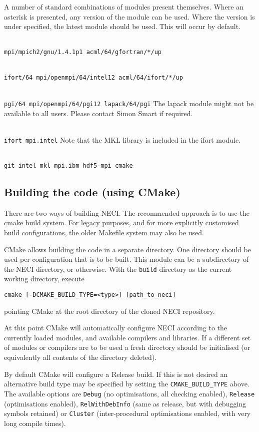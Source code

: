 \documentclass[a4paper,notitlepage]{scrreprt}
\newcommand\headitem[1]{\needspace{1.5\baselineskip}\item[{\boldmath #1 \nopagebreak}] \hfill \\ \nopagebreak}
\let\code\lstinline
\begin{document}
	A number of standard combinations of modules present themselves. Where an
	asterisk is presented, any version of the module can be used. Where the
	version is under specified, the latest module should be used. This will
	occur by default.
	\begin{description}
		\headitem{gfortran (Cambridge)}
			\code{mpi/mpich2/gnu/1.4.1p1 acml/64/gfortran/*/up}
		\headitem{ifort (Cambridge)}
			\code{ifort/64 mpi/openmpi/64/intel12 acml/64/ifort/*/up}
		\headitem{PGI (Cambridge)}
			\code{pgi/64 mpi/openmpi/64/pgi12 lapack/64/pgi} \linebreak
			The lapack module might not be available to all users. Please
			contact Simon Smart if required.
		\headitem{ifort (Max Planck FKF)}
			\code{ifort mpi.intel}\linebreak
			Note that the MKL library is included in the ifort module.
		\headitem{ifort (hydra)}
			\code{git intel mkl mpi.ibm hdf5-mpi cmake}
	\end{description}

\subsection{Building the code (using CMake)}
	There are two ways of building NECI. The recommended approach is to use
	the cmake build system. For legacy purposes, and for more explicitly
	customised build configurations, the older Makefile system may also
	be used.

	CMake allows building the code in a separate directory. One directory
	should be used per configuration that is to be built. This module can
	be a subdirectory of the NECI directory, or otherwise.
	With the \code{build} directory as the current working directory,
	execute
	\begin{lstlisting}[gobble=4]
	cmake [-DCMAKE_BUILD_TYPE=<type>] [path_to_neci]
	\end{lstlisting}
	pointing CMake at the root directory of the cloned NECI repository.

	At this point CMake will automatically configure NECI according to the
	currently loaded modules, and available compilers and libraries. If a
	different set of modules or compilers are to be used a fresh directory
	should be initialised (or equivalently all contents of the directory
	deleted).

	By default CMake will configure a Release build. If this is not desired
	an alternative build type may be specified by setting the
	\code{CMAKE_BUILD_TYPE} above. The available options are \code{Debug} (no
	optimisations, all checking enabled), \code{Release} (optimisations
	enabled), \code{RelWithDebInfo} (same as release, but with debugging
	symbols retained) or \code{Cluster} (inter-procedural optimisations
	enabled, with very long compile times).
\end{document}
